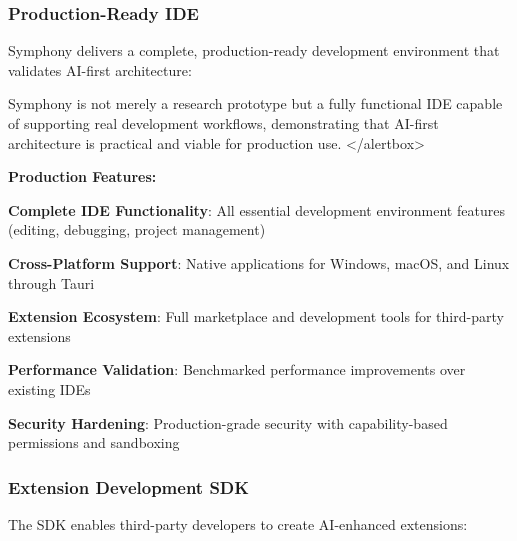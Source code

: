 \begin{successbox}
\begin{alertbox}
\begin{successbox}
\begin{alertbox}
\begin{infobox}[title=Theoretical Framework: AI-First Design Principles]
\begin{successbox}
\subsubsection{Production-Ready IDE}

Symphony delivers a complete, production-ready development environment that validates AI-first architecture:

\begin{alertbox}
Symphony is not merely a research prototype but a fully functional IDE capable of supporting real development workflows, demonstrating that AI-first architecture is practical and viable for production use.
</alertbox>

\textbf{Production Features:}

\begin{expandedlist}
    \item \textbf{Complete IDE Functionality}: All essential development environment features (editing, debugging, project management)
    
    \item \textbf{Cross-Platform Support}: Native applications for Windows, macOS, and Linux through Tauri
    
    \item \textbf{Extension Ecosystem}: Full marketplace and development tools for third-party extensions
    
    \item \textbf{Performance Validation}: Benchmarked performance improvements over existing IDEs
    
    \item \textbf{Security Hardening}: Production-grade security with capability-based permissions and sandboxing
\end{expandedlist}

\subsubsection{Extension Development SDK}

The SDK enables third-party developers to create AI-enhanced extensions:


\end{alertbox}
\end{successbox}
\end{infobox}
\end{alertbox}
\end{successbox}
\end{alertbox}
\end{successbox}
